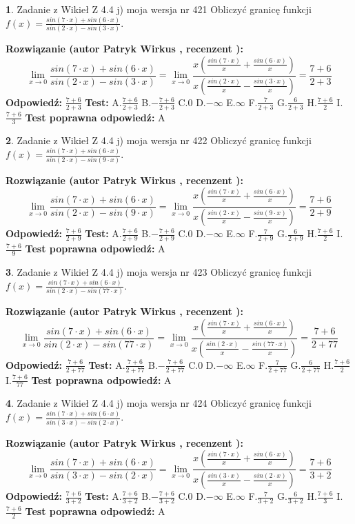 \documentclass[12pt, a4paper]{article}
\theoremstyle{definition} %
\newtheorem{zad}{}
\newcommand{\zadStart}[1]{\begin{zad}#1\newline}
\newcommand{\zadStop}{\end{zad}}
\newcommand{\rozwStart}[2]{\noindent \textbf{Rozwiązanie (autor #1 , recenzent #2): }\newline}
\newcommand{\rozwStop}{\newline}
\newcommand{\odpStart}{\noindent \textbf{Odpowiedź:}\newline}
\newcommand{\odpStop}{\newline}
\newcommand{\testStart}{\noindent \textbf{Test:}\newline}
\newcommand{\testStop}{\newline}
\newcommand{\kluczStart}{\noindent \textbf{Test poprawna odpowiedź:}\newline}
\newcommand{\kluczStop}{\newline}
\begin{document}
\zadStart{Zadanie z Wikieł Z 4.4 j) moja wersja nr 421}
Obliczyć granicę funkcji $f(x)=\frac{sin(7\cdot x) +sin(6\cdot x)}{sin(2\cdot x) -sin(3\cdot x)}$.
\zadStop
\rozwStart{Patryk Wirkus}{}
$$\lim\limits_{x\to 0}\frac{sin(7\cdot x) +sin(6\cdot x)}{sin(2\cdot x) -sin(3\cdot x)}=\lim\limits_{x\to 0}\frac{x(\frac{sin(7\cdot x)}{x}+\frac{sin(6\cdot x)}{x})}{x(\frac{sin(2\cdot x)}{x}-\frac{sin(3\cdot x)}{x})}=\frac{7+6}{2+3}$$
\rozwStop
\odpStart
$\frac{7+6}{2+3}$
\odpStop
\testStart
A.$\frac{7+6}{2+3}$
B.$-\frac{7+6}{2+3}$
C.$0$
D.$-\infty$
E.$\infty$
F.$\frac{7}{2+3}$
G.$\frac{6}{2+3}$
H.$\frac{7+6}{2}$
I.$\frac{7+6}{3}$
\testStop
\kluczStart
A
\kluczStop



\zadStart{Zadanie z Wikieł Z 4.4 j) moja wersja nr 422}
Obliczyć granicę funkcji $f(x)=\frac{sin(7\cdot x) +sin(6\cdot x)}{sin(2\cdot x) -sin(9\cdot x)}$.
\zadStop
\rozwStart{Patryk Wirkus}{}
$$\lim\limits_{x\to 0}\frac{sin(7\cdot x) +sin(6\cdot x)}{sin(2\cdot x) -sin(9\cdot x)}=\lim\limits_{x\to 0}\frac{x(\frac{sin(7\cdot x)}{x}+\frac{sin(6\cdot x)}{x})}{x(\frac{sin(2\cdot x)}{x}-\frac{sin(9\cdot x)}{x})}=\frac{7+6}{2+9}$$
\rozwStop
\odpStart
$\frac{7+6}{2+9}$
\odpStop
\testStart
A.$\frac{7+6}{2+9}$
B.$-\frac{7+6}{2+9}$
C.$0$
D.$-\infty$
E.$\infty$
F.$\frac{7}{2+9}$
G.$\frac{6}{2+9}$
H.$\frac{7+6}{2}$
I.$\frac{7+6}{9}$
\testStop
\kluczStart
A
\kluczStop



\zadStart{Zadanie z Wikieł Z 4.4 j) moja wersja nr 423}
Obliczyć granicę funkcji $f(x)=\frac{sin(7\cdot x) +sin(6\cdot x)}{sin(2\cdot x) -sin(77\cdot x)}$.
\zadStop
\rozwStart{Patryk Wirkus}{}
$$\lim\limits_{x\to 0}\frac{sin(7\cdot x) +sin(6\cdot x)}{sin(2\cdot x) -sin(77\cdot x)}=\lim\limits_{x\to 0}\frac{x(\frac{sin(7\cdot x)}{x}+\frac{sin(6\cdot x)}{x})}{x(\frac{sin(2\cdot x)}{x}-\frac{sin(77\cdot x)}{x})}=\frac{7+6}{2+77}$$
\rozwStop
\odpStart
$\frac{7+6}{2+77}$
\odpStop
\testStart
A.$\frac{7+6}{2+77}$
B.$-\frac{7+6}{2+77}$
C.$0$
D.$-\infty$
E.$\infty$
F.$\frac{7}{2+77}$
G.$\frac{6}{2+77}$
H.$\frac{7+6}{2}$
I.$\frac{7+6}{77}$
\testStop
\kluczStart
A
\kluczStop



\zadStart{Zadanie z Wikieł Z 4.4 j) moja wersja nr 424}
Obliczyć granicę funkcji $f(x)=\frac{sin(7\cdot x) +sin(6\cdot x)}{sin(3\cdot x) -sin(2\cdot x)}$.
\zadStop
\rozwStart{Patryk Wirkus}{}
$$\lim\limits_{x\to 0}\frac{sin(7\cdot x) +sin(6\cdot x)}{sin(3\cdot x) -sin(2\cdot x)}=\lim\limits_{x\to 0}\frac{x(\frac{sin(7\cdot x)}{x}+\frac{sin(6\cdot x)}{x})}{x(\frac{sin(3\cdot x)}{x}-\frac{sin(2\cdot x)}{x})}=\frac{7+6}{3+2}$$
\rozwStop
\odpStart
$\frac{7+6}{3+2}$
\odpStop
\testStart
A.$\frac{7+6}{3+2}$
B.$-\frac{7+6}{3+2}$
C.$0$
D.$-\infty$
E.$\infty$
F.$\frac{7}{3+2}$
G.$\frac{6}{3+2}$
H.$\frac{7+6}{3}$
I.$\frac{7+6}{2}$
\testStop
\kluczStart
A
\kluczStop
\end{document}
